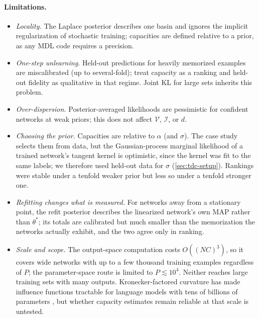 \documentclass[10pt,twocolumn,letterpaper]{article}
\theoremstyle{definition}
\newcommand{\Vol}{\mathcal{V}}
\newcommand{\Inf}{\mathcal{I}}
\newcommand{\dof}{d}
\begin{document}
\paragraph{Limitations.}
\begin{itemize}
\item \emph{Locality.} The Laplace posterior describes one basin and ignores the implicit regularization of stochastic training; capacities are defined relative to a prior, as any MDL code requires a precision.
\item \emph{One-step unlearning.} Held-out predictions for heavily memorized examples are miscalibrated (up to several-fold); treat capacity as a ranking and held-out fidelity as qualitative in that regime. Joint KL for large sets inherits this problem.
\item \emph{Over-dispersion.} Posterior-averaged likelihoods are pessimistic for confident networks at weak priors; this does not affect $\Vol$, $\Inf$, or $\dof$.
\item \emph{Choosing the prior.} Capacities are relative to $\alpha$ (and $\sigma$). The case study selects them from data, but the Gaussian-process marginal likelihood of a trained network's tangent kernel is optimistic, since the kernel was fit to the same labels; we therefore used held-out data for $\sigma$ (\cref{sec:tdc-setup}). Rankings were stable under a tenfold weaker prior but less so under a tenfold stronger one.
\item \emph{Refitting changes what is measured.} For networks away from a stationary point, the refit posterior describes the linearized network's own MAP rather than $\theta^*$; its totals are calibrated but much smaller than the memorization the networks actually exhibit, and the two agree only in ranking.
\item \emph{Scale and scope.} The output-space computation costs $O((NC)^3)$, so it covers wide networks with up to a few thousand training examples regardless of $P$; the parameter-space route is limited to $P\lesssim10^4$. Neither reaches large training sets with many outputs. Kronecker-factored curvature has made influence functions tractable for language models with tens of billions of parameters \citep{grosse2023}, but whether capacity estimates remain reliable at that scale is untested.
\end{itemize}
\end{document}
